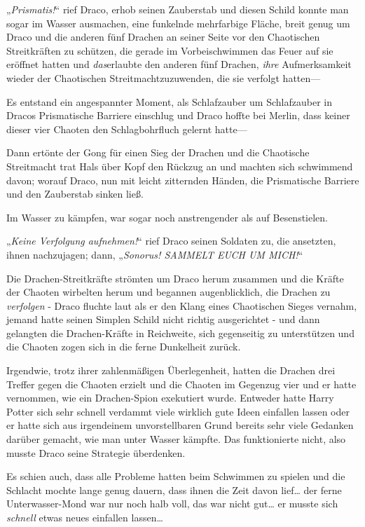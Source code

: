 {„\emph{Prismatis!}“ rief Draco, erhob seinen Zauberstab und diesen Schild konnte man sogar im Wasser ausmachen, eine funkelnde mehrfarbige Fläche, breit genug um Draco und die anderen fünf Drachen an seiner Seite vor den Chaotischen Streitkräften zu schützen, die gerade im Vorbeischwimmen das Feuer auf sie eröffnet hatten und \emph{das}erlaubte den anderen fünf Drachen, \emph{ihre} Aufmerksamkeit wieder der Chaotischen Streitmachtzuzuwenden, die sie verfolgt hatten—

Es entstand ein angespannter Moment, als Schlafzauber um Schlafzauber in Dracos Prismatische Barriere einschlug und Draco hoffte bei Merlin, dass keiner dieser vier Chaoten den Schlagbohrfluch gelernt hatte—

Dann ertönte der Gong für einen Sieg der Drachen und die Chaotische Streitmacht trat Hals über Kopf den Rückzug an und machten sich schwimmend davon; worauf Draco, nun mit leicht zitternden Händen, die Prismatische Barriere und den Zauberstab sinken ließ.

Im Wasser zu kämpfen, war sogar noch anstrengender als auf Besenstielen.

„\emph{Keine Verfolgung aufnehmen!}“ rief Draco seinen Soldaten zu, die ansetzten, ihnen nachzujagen; dann, „\emph{Sonorus! SAMMELT EUCH UM MICH!}“

Die Drachen-Streitkräfte strömten um Draco herum zusammen und die Kräfte der Chaoten wirbelten herum und begannen augenblicklich, die Drachen zu \emph{verfolgen} - Draco fluchte laut als er den Klang eines Chaotischen Sieges vernahm, jemand hatte seinen Simplen Schild nicht richtig ausgerichtet - und dann gelangten die Drachen-Kräfte in Reichweite, sich gegenseitig zu unterstützen und die Chaoten zogen sich in die ferne Dunkelheit zurück.

Irgendwie, trotz ihrer zahlenmäßigen Überlegenheit, hatten die Drachen drei Treffer gegen die Chaoten erzielt und die Chaoten im Gegenzug vier und er hatte vernommen, wie ein Drachen-Spion exekutiert wurde. Entweder hatte Harry Potter sich sehr schnell verdammt viele wirklich gute Ideen einfallen lassen oder er hatte sich aus irgendeinem unvorstellbaren Grund bereits sehr viele Gedanken darüber gemacht, wie man unter Wasser kämpfte. Das funktionierte nicht, also musste Draco seine Strategie überdenken.

Es schien auch, dass alle Probleme hatten beim Schwimmen zu spielen und die Schlacht mochte lange genug dauern, dass ihnen die Zeit davon lief… der ferne Unterwasser-Mond war nur noch halb voll, das war nicht gut… er musste sich \emph{schnell} etwas neues einfallen lassen…

}

